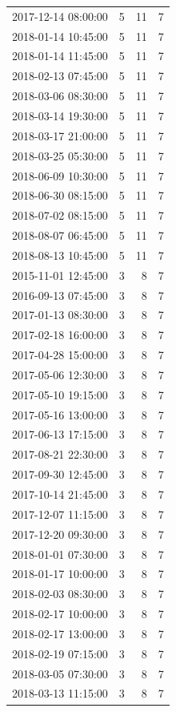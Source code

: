 \begin{tabular}{lrrr}
2017-12-14 08:00:00 & 5 & 11 & 7 \\
2018-01-14 10:45:00 & 5 & 11 & 7 \\
2018-01-14 11:45:00 & 5 & 11 & 7 \\
2018-02-13 07:45:00 & 5 & 11 & 7 \\
2018-03-06 08:30:00 & 5 & 11 & 7 \\
2018-03-14 19:30:00 & 5 & 11 & 7 \\
2018-03-17 21:00:00 & 5 & 11 & 7 \\
2018-03-25 05:30:00 & 5 & 11 & 7 \\
2018-06-09 10:30:00 & 5 & 11 & 7 \\
2018-06-30 08:15:00 & 5 & 11 & 7 \\
2018-07-02 08:15:00 & 5 & 11 & 7 \\
2018-08-07 06:45:00 & 5 & 11 & 7 \\
2018-08-13 10:45:00 & 5 & 11 & 7 \\
2015-11-01 12:45:00 & 3 & 8 & 7 \\
2016-09-13 07:45:00 & 3 & 8 & 7 \\
2017-01-13 08:30:00 & 3 & 8 & 7 \\
2017-02-18 16:00:00 & 3 & 8 & 7 \\
2017-04-28 15:00:00 & 3 & 8 & 7 \\
2017-05-06 12:30:00 & 3 & 8 & 7 \\
2017-05-10 19:15:00 & 3 & 8 & 7 \\
2017-05-16 13:00:00 & 3 & 8 & 7 \\
2017-06-13 17:15:00 & 3 & 8 & 7 \\
2017-08-21 22:30:00 & 3 & 8 & 7 \\
2017-09-30 12:45:00 & 3 & 8 & 7 \\
2017-10-14 21:45:00 & 3 & 8 & 7 \\
2017-12-07 11:15:00 & 3 & 8 & 7 \\
2017-12-20 09:30:00 & 3 & 8 & 7 \\
2018-01-01 07:30:00 & 3 & 8 & 7 \\
2018-01-17 10:00:00 & 3 & 8 & 7 \\
2018-02-03 08:30:00 & 3 & 8 & 7 \\
2018-02-17 10:00:00 & 3 & 8 & 7 \\
2018-02-17 13:00:00 & 3 & 8 & 7 \\
2018-02-19 07:15:00 & 3 & 8 & 7 \\
2018-03-05 07:30:00 & 3 & 8 & 7 \\
2018-03-13 11:15:00 & 3 & 8 & 7 \\

\end{tabular}
